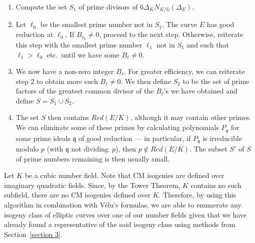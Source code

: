 \documentclass{amsart}
\theoremstyle{definition}
\newcommand{\Q}{\mathbb{Q}}
\newcommand{\q}{\mathfrak{q}}
\begin{document}
\begin{enumerate}
\item Compute the set $S_1$ of prime divisors of $6 \Delta_K N_{K/\Q}(\Delta_E)$.
\item Let $\ell_0$ be the smallest prime number not in $S_1$. The curve $E$ has good reduction at $\ell_0$. If $B_{\ell_0} \neq 0$, proceed to the next step. Otherwise, reiterate this step with the smallest prime number $\ell_1$ not in $S_1$ and such that $\ell_1 > \ell_0$ etc.~until we have some $B_\ell \neq 0$.
\item We now have a non-zero integer $B_\ell$. For greater efficiency, we can reiterate step 2 to obtain more such $B_\ell \neq 0$. We then define $S_2$ to be the set of prime factors of the greatest common divisor of the $B_\ell$'s we have obtained and define $S = S_1 \cup S_2$.
\item The set $S$ then contains $Red(E/K)$, although it may contain other primes. We can eliminate some of these primes by calculating polynomials $P_\q$ for some prime ideals $\q$ of good reduction --- in particular, if $P_\q$ is irreducible modulo $p$ (with $\q$ not dividing~$p$), then $p \notin Red(E/K)$. The subset $S'$ of $S$ of prime numbers remaining is then usually small.
\end{enumerate}

Let $K$ be a cubic number field. Note that CM isogenies are defined over imaginary quadratic fields. Since, by the Tower Theorem, $K$ contains no such subfield, there are no CM isogenies defined over $K$. Therefore, by using this algorithm in combination with V{\'e}lu's formulas, we are able to enumerate any isogeny class of elliptic curves over one of our number fields given that we have already found a representative of the said isogeny class using methods from Section~\ref{section 3}.
\end{document}
